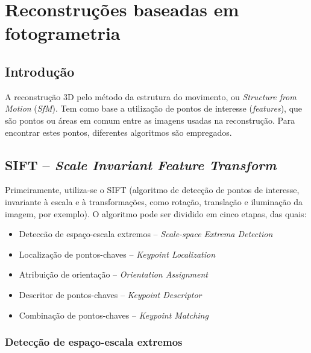 \chapter*{Reconstruções baseadas em fotogrametria}\label{sec:pontosdeinteresse}
%
\section{Introdução}

A reconstrução 3D pelo método da estrutura do movimento, ou {\it Structure from Motion} ({\it SfM}). Tem como base a utilização de pontos de interesse
({\it features}), que são pontos ou áreas em comum entre as imagens usadas na reconstrução. Para encontrar estes pontos, diferentes algoritmos são empregados.

\section{ SIFT -- {\it Scale Invariant Feature Transform}}

Primeiramente, utiliza-se o SIFT (algoritmo de detecção de pontos de interesse, invariante à escala e à transformações, como rotação, translação e iluminação da imagem, por exemplo).
O algoritmo pode ser dividido em cinco etapas, das quais:

\begin{itemize}
	\item{Deteccão de espaço-escala extremos -- {\it Scale-space Extrema Detection}}
	\item{Localização de pontos-chaves -- {\it Keypoint Localization}}
	\item{Atribuição de orientação -- {\it Orientation Assignment}}
	\item{Descritor de pontos-chaves -- {\it Keypoint Descriptor}}
	\item{Combinação de pontos-chaves -- {\it Keypoint Matching}}
\end{itemize}


\subsection{Detecção de espaço-escala extremos}



